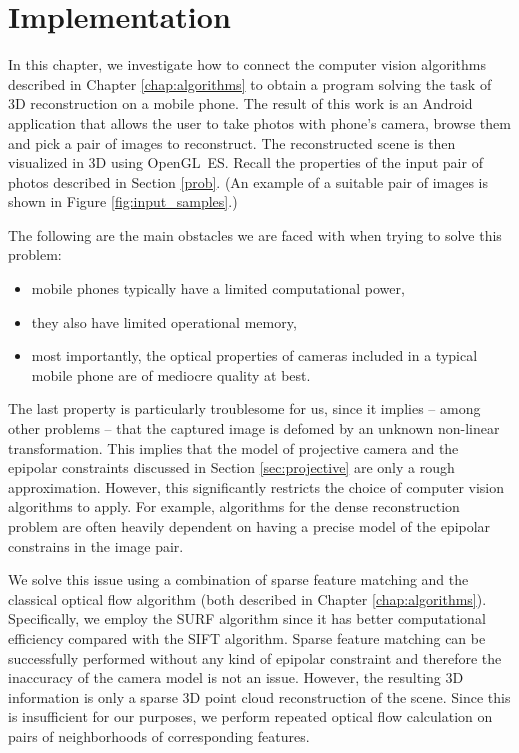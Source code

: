 \chapter{Implementation}
\label{chap:implementation}

In this chapter, we investigate how to connect the computer vision algorithms described in Chapter \ref{chap:algorithms} to obtain a program solving the task of 3D reconstruction on a mobile phone. 
The result of this work is an Android application that allows the user to take photos with phone's camera, browse them and pick a pair of images to reconstruct. 
The reconstructed scene is then visualized in 3D using OpenGL~ES.
Recall the properties of the input pair of photos described in Section \ref{prob}.
(An example of a suitable pair of images is shown in Figure \ref{fig:input_samples}.)

The following are the main obstacles we are faced with when trying to solve this problem: 
\begin{itemize}
\item mobile phones typically have a limited computational power, 
\item they also have limited operational memory, 
\item most importantly, the optical properties of cameras included in a typical mobile phone are of mediocre quality at best. 
\end{itemize} 
The last property is particularly troublesome for us, since it implies -- among other problems -- that the captured image is defomed by an unknown non-linear transformation. 
This implies that the model of projective camera and the epipolar constraints discussed in Section \ref{sec:projective} are only a rough approximation. 
However, this significantly restricts the choice of computer vision algorithms to apply. 
For example, algorithms for the dense reconstruction problem are often heavily dependent on having a precise model of the epipolar constrains in the image pair. 

We solve this issue using a combination of sparse feature matching and the classical optical flow algorithm (both described in Chapter \ref{chap:algorithms}). 
Specifically, we employ the SURF algorithm since it has better computational efficiency compared with the SIFT algorithm.
Sparse feature matching can be successfully performed without any kind of epipolar constraint and therefore the inaccuracy of the camera model is not an issue. 
However, the resulting 3D information is only a sparse 3D point cloud reconstruction of the scene. 
Since this is insufficient for our purposes, we perform repeated optical flow calculation on pairs of neighborhoods of corresponding features. 

